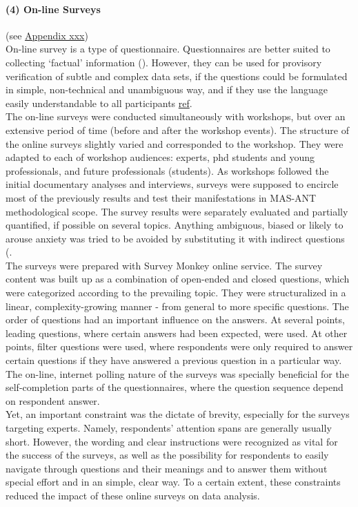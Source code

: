 \documentclass[11pt]{report}
\begin{document}
\paragraph{(4) On-line Surveys}
(see \href{ref}{Appendix xxx})
\\
On-line survey is a type of questionnaire. Questionnaires  are  better  suited  to  collecting  ‘factual’ information (\cite{Payne and Payne 2004}). However, they can be used for provisory verification of subtle and complex data sets, if the questions could be formulated in simple, non-technical and unambiguous way, and if they use the language easily understandable to all participants \href{ref}{ref}.
\\
The on-line surveys were conducted simultaneously with workshops, but over an extensive period of time (before and after the workshop events). The structure of the online surveys slightly varied and corresponded to the workshop. They were adapted to each of workshop audiences: experts, phd students and young professionals, and future professionals (students). As workshops followed the initial documentary analyses and interviews, surveys were supposed to encircle most of the previously results and test their manifestations in MAS-ANT methodological scope. The survey results were separately evaluated and partially quantified, if possible on several topics. Anything ambiguous, biased or likely to arouse anxiety was tried to be avoided by substituting it with indirect questions (\cite{Payne and Payne 2004}.
\\
The surveys were prepared with Survey Monkey online service. The survey content was built up as a combination of open-ended and closed questions, which were categorized according to the prevailing topic. They were structuralized in a linear, complexity-growing manner - from general to more specific questions. The order of questions had an important influence on the answers. At several points, leading questions, where certain answers had been expected, were used. At other points, filter questions were used, where respondents were only required to answer certain questions if they have answered a previous question in a particular way. The on-line, internet polling nature of the surveys was specially beneficial for the self-completion parts of the questionnaires, where the question sequence depend on respondent answer. 
\\
Yet, an important constraint was the dictate of brevity, especially for the surveys targeting experts. Namely, respondents’ attention spans are generally usually short. 
However, the wording and clear instructions were recognized as vital for the success of the surveys, as well as the possibility for respondents to easily navigate through questions and their meanings and to answer them without special effort and in an simple, clear way. To a certain extent, these constraints reduced the impact of these online surveys on data analysis.
\end{document}
